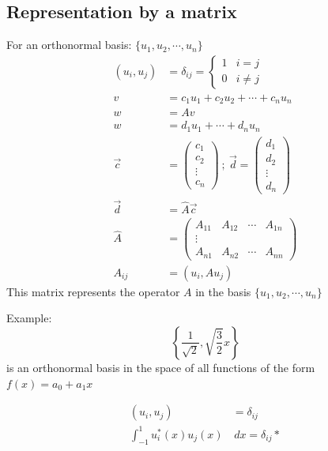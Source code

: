 \documentclass[a4paper,11pt,normalem]{article}
\begin{document}
\subsection{Representation by a matrix}\label{representation-by-a-matrix}
For an orthonormal basis: \(\{u_1,u_2,\cdots,u_n\}\) \[
    \begin{aligned}
    (u_i,u_j) &= \delta_{ij} = \begin{cases} 1 & i = j \\ 0 & i \neq j \end{cases} \\
    v&= c_1u_1 + c_2u_2 + \cdots + c_nu_n \\
    w &= Av \\
    w &= d_1u_1 + \cdots + d_nu_n \\
    \vec{c} &= \begin{pmatrix} c_1 \\ c_2 \\ \vdots \\ c_n \end{pmatrix} ~;~ \vec{d} = \begin{pmatrix} d_1 \\ d_2 \\ \vdots \\ d_n \end{pmatrix} \\
    \vec{d} &= \hat{A}\vec{c} \\
    \hat{A} &= \begin{pmatrix} A_{11} & A_{12} & \cdots & A_{1n} \\ \vdots & & & \\ A_{n1} & A_{n2} & \cdots & A_{nn} \end{pmatrix} \\
    A_{ij} &= (u_i, Au_j)
    \end{aligned}
\] 
This matrix represents the operator \(A\) in the basis \(\{u_1,u_2,\cdots,u_n\}\)

Example:
\[\left\{\frac{1}{\sqrt{2}}, \sqrt{\frac{3}{2}}x\right\}\] is an
orthonormal basis in the space of all functions of the form
\(f(x) = a_0 + a_1x\)

\[
    \begin{aligned}
    (u_i,u_j) &= \delta_{ij} \\
    \int_{-1}^1 u_{i}^{*}(x)u_j(x)&\,dx = \delta_{ij}*
    \end{aligned}
\]

\section{}\label{lecture-5}
\end{document}

